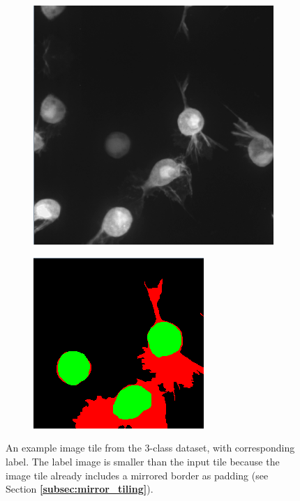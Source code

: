 \begin {figure}[!ht]
	
	\begin {subfigure}[{position=b}]{0.6\linewidth}
		\begin {center}
		\includegraphics[scale=0.65]{img/dataset_ex1.png}
		\end{center}
	\end {subfigure}
	\begin {subfigure}[{position=b}]{0.3\linewidth}
		\begin {center}
		\includegraphics[scale=0.60]{img/dataset_ex2.png}
		\end{center}
	\end {subfigure}

		\caption[An example image tile from the 3-class dataset.]{An example image tile from the 3-class dataset, with corresponding label. The label image is smaller than the input tile because the image tile already includes a mirrored border as padding (see Section \textbf{\ref{subsec:mirror_tiling}}).}
		\label{fig:dataset_example}
	

\end {figure}

